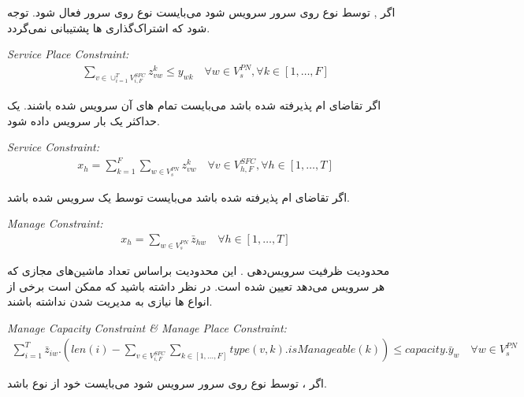 اگر , 
توسط  نوع 
روی سرور  سرویس شود می‌بایست
 نوع 
روی سرور  فعال شود.
توجه شود که
اشتراک‌گذاری ها پشتیبانی نمی‌گردد.

\begin{latin}
    \textit{Service Place Constraint:}
    \begin{align}
        \sum_{v \in \cup_{i=1}^T V_{i, F}^{SFC}} z_{vw}^k \le y_{wk}
        \quad
        \forall w \in V_s^{PN}, \forall k \in [1,\ldots, F]
    \end{align}
\end{latin}

اگر تقاضای ام پذیرفته شده باشد
می‌بایست تمام های آن‌
سرویس شده باشند.
یک  حداکثر یک بار سرویس داده شود.

\begin{latin}
    \textit{Service Constraint:}
    \begin{align}
        x_h = \sum_{k=1}^{F} \sum_{w \in V_{s}^{PN}} z_{vw}^{k}
        \quad
        \forall v \in V_{h,F}^{SFC}, \forall h \in [1,\ldots, T]
    \end{align}
\end{latin}

اگر تقاضای ام پذیرفته شده باشد
می‌بایست توسط یک  سرویس شده باشد.

\begin{latin}
    \textit{Manage Constraint:}
    \begin{align}
        x_h = \sum_{w \in V_{s}^{PN}} \bar{z}_{hw}
        \quad
        \forall h \in [1,\ldots, T]
    \end{align}
\end{latin}

محدودیت ظرفیت سرویس‌دهی .
این محدودیت براساس تعداد ماشین‌های مجازی که هر
سرویس می‌دهد تعیین شده است.
در نظر داشته باشید که ممکن است برخی از انواع
‌ها
نیازی به مدیریت شدن نداشته باشند.

\begin{latin}
    \textit{Manage Capacity Constraint \& Manage Place Constraint:}
    \begin{align}
        \sum_{i=1}^{T} \bar{z}_{iw} . (len(i) - \sum_{v \in V_{i, F}^{SFC}} \sum_{k \in [1, \dots, F]} type(v, k) . isManageable(k)) \le capacity . \bar{y}_{w}
        \quad
        \forall w \in V_{s}^{PN}
    \end{align}
\end{latin}

اگر ،  توسط
نوع  روی سرور 
سرویس شود می‌بایست خود از نوع  باشد.

